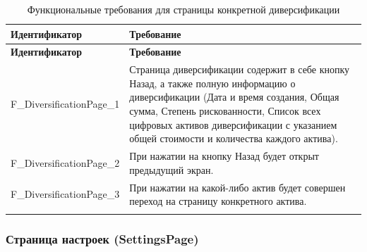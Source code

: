 \documentclass[a4paper, 14pt]{article}
\begin{document}
\begin{longtable}{| p{} | p{} |}
    \hline
    \textbf{Идентификатор}          & \textbf{Требование}                                                                                                                                                                \\
    \hline
    \endfirsthead
    \hline
    \textbf{Идентификатор}          & \textbf{Требование}                                                                                                                                                                \\
    \hline
    \endhead

    F\_DiversificationPage\_1       & Страница диверсификации содержит в себе кнопку Назад, а также полную информацию о диверсификации (Дата и время создания, Общая сумма, Степень рискованности, Список всех цифровых активов диверсификации с указанием общей стоимости и количества каждого актива).      \\ \hline
    F\_DiversificationPage\_2       & При нажатии на кнопку Назад будет открыт предыдущий экран.                                                                                                                         \\ \hline
    F\_DiversificationPage\_3       & При нажатии на какой-либо актив будет совершен переход на страницу конкретного актива.                                                                                             \\ \hline

    \caption{Функциональные требования для страницы конкретной диверсификации}
\end{longtable}

\subsubsection{Страница настроек (SettingsPage)}
\end{document}
